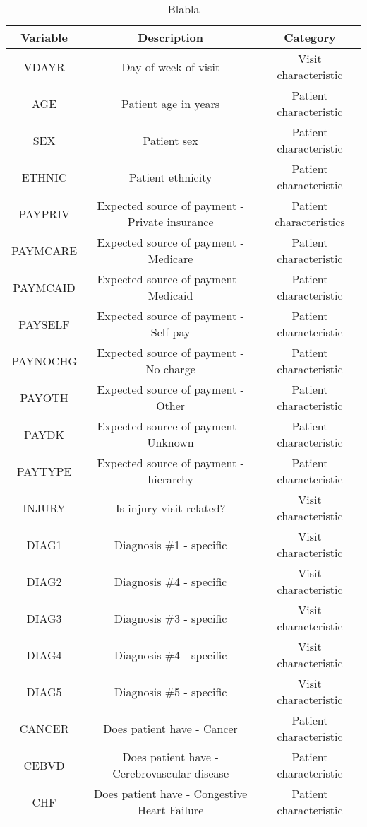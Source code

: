 \documentclass[11pt]{SelfArxOneColBMN}
\begin{document}
\begin{table*}[t]
  \centering
  \caption{Blabla} %
  \begin{tabular}{|c|c|c|}
  \hline
  Variable & Description & Category\\
  \hline
    VDAYR & Day of week of visit & Visit characteristic \\
    AGE & Patient age in years & Patient characteristic\\
    SEX & Patient sex & Patient characteristic\\
    ETHNIC & Patient ethnicity & Patient characteristic\\
    PAYPRIV & Expected source of payment - Private insurance & Patient characteristics\\
    PAYMCARE & Expected source of payment - Medicare & Patient characteristic\\
    PAYMCAID & Expected source of payment - Medicaid & Patient characteristic\\
    PAYSELF & Expected source of payment - Self pay & Patient characteristic\\
    PAYNOCHG & Expected source of payment - No charge & Patient characteristic\\
    PAYOTH & Expected source of payment - Other & Patient characteristic\\
    PAYDK & Expected source of payment - Unknown & Patient characteristic\\
    PAYTYPE & Expected source of payment - hierarchy & Patient characteristic\\
    INJURY & Is injury visit related? & Visit characteristic\\
    DIAG1 & Diagnosis \#1 - specific & Visit characteristic\\
    DIAG2 & Diagnosis \#4 - specific & Visit characteristic\\
    DIAG3 & Diagnosis \#3 - specific & Visit characteristic\\
    DIAG4 & Diagnosis \#4 - specific & Visit characteristic\\
    DIAG5 & Diagnosis \#5 - specific & Visit characteristic\\
    CANCER & Does patient have - Cancer & Patient characteristic\\
    CEBVD & Does patient have - Cerebrovascular disease & Patient characteristic\\
    CHF & Does patient have - Congestive Heart Failure & Patient characteristic\\

\end{tabular}
\end{table*}
\end{document}
